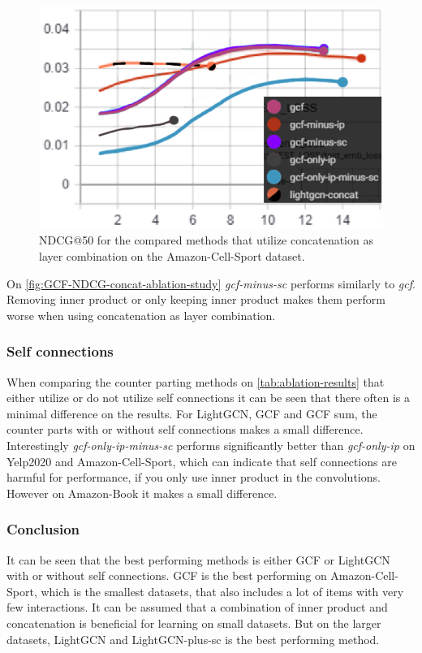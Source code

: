 \begin{figure}[h!]
    \includegraphics[width=\linewidth]{figures/amazon-cell-sport-gcf-ndcg.png}
    \caption{NDCG@50 for the compared methods that utilize concatenation as layer combination on the Amazon-Cell-Sport dataset.}
    \label{fig:GCF-NDCG-concat-ablation-study-Amazon-Cell-Sport}
\end{figure}
On \autoref{fig:GCF-NDCG-concat-ablation-study} \textit{gcf-minus-sc} performs similarly to \textit{gcf}.
Removing inner product or only keeping inner product makes them perform worse when using concatenation as layer combination.
\subsubsection{Self connections}
When comparing the counter parting methods on \autoref{tab:ablation-results} that either utilize or do not utilize self connections it can be seen that there often is a minimal difference on the results.
For LightGCN, GCF and GCF sum, the counter parts with or without self connections makes a small difference.
Interestingly \textit{gcf-only-ip-minus-sc} performs significantly better than \textit{gcf-only-ip} on Yelp2020 and Amazon-Cell-Sport, which can indicate that self connections are harmful for performance, if you only use inner product in the convolutions.
However on Amazon-Book it makes a small difference.
\subsubsection{Conclusion}
It can be seen that the best performing methods is either GCF or LightGCN with or without self connections.
GCF is the best performing on Amazon-Cell-Sport, which is the smallest datasets, that also includes a lot of items with very few interactions.
It can be assumed that a combination of inner product and concatenation is beneficial for learning on small datasets.
But on the larger datasets, LightGCN and LightGCN-plus-sc is the best performing method.
